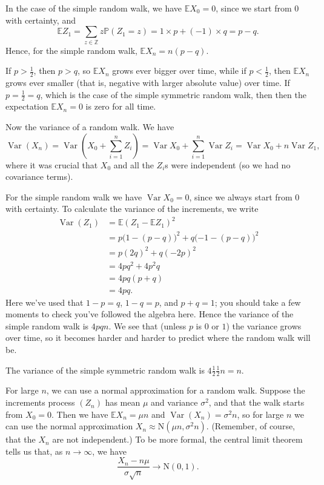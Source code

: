 \documentclass[
  a4paper,
]{article}
\theoremstyle{definition}
\theoremstyle{definition}
\theoremstyle{definition}
\theoremstyle{remark}
\begin{document}
In the case of the simple random walk, we have \(\mathbb E X_0 = 0\), since we start from \(0\) with certainty, and
\[ \mathbb E Z_1 = \sum_{z \in \mathbb Z} z \mathbb P(Z_1 = z) = 1\times p + (-1)\times q = p-q .\]
Hence, for the simple random walk, \(\mathbb EX_n = n(p-q)\).

If \(p > \frac12\), then \(p > q\), so \(\mathbb E X_n\) grows ever bigger over time, while if \(p < \frac12\), then \(\mathbb E X_n\) grows ever smaller (that is, negative with larger absolute value) over time. If \(p = \frac12 = q\), which is the case of the simple symmetric random walk, then then the expectation \(\mathbb E X_n = 0\) is zero for all time.

Now the variance of a random walk. We have
\[ \operatorname{Var}(X_n) = \operatorname{Var}\left(X_0 + \sum_{i=1}^n Z_i\right) = \operatorname{Var}X_0 + \sum_{i=1}^n \operatorname{Var}Z_i = \operatorname{Var}X_0 + n \operatorname{Var}Z_1 , \]
where it was crucial that \(X_0\) and all the \(Z_i\)s were independent (so we had no covariance terms).

For the simple random walk we have \(\operatorname{Var}X_0 = 0\), since we always start from \(0\) with certainty. To calculate the variance of the increments, we write
\begin{align*}
  \operatorname{Var}(Z_1) &= \mathbb E (Z_1 - \mathbb EZ_1)^2 \\
            &= p\big(1 - (p-q)\big)^2 + q \big( {-1} - (p-q)\big)^2\\
            &= p(2q)^2 + q(-2p)^2\\
            &= 4pq^2 + 4p^2q \\
            &= 4pq(p+q) \\
            &= 4pq .
  \end{align*}
Here we've used that \(1-p = q\), \(1-q=p\), and \(p+q = 1\); you should take a few moments to check you've followed the algebra here. Hence the variance of the simple random walk is \(4pqn\). We see that (unless \(p\) is \(0\) or \(1\)) the variance grows over time, so it becomes harder and harder to predict where the random walk will be.

The variance of the simple symmetric random walk is \(4 \frac12 \frac12 n = n\).

For large \(n\), we can use a normal approximation for a random walk. Suppose the increments process \((Z_n)\) has mean \(\mu\) and variance \(\sigma^2\), and that the walk starts from \(X_0 = 0\). Then we have \(\mathbb E X_n = \mu n\) and \(\operatorname{Var}(X_n) = \sigma^2 n\), so for large \(n\) we can use the normal approximation \(X_n \approx \mathrm{N}(\mu n, \sigma^2 n)\). (Remember, of course, that the \(X_n\) are not independent.) To be more formal, the central limit theorem tells us that, as \(n \to \infty\), we have
\[ \frac{X_n - n\mu}{\sigma \sqrt{n}} \to \mathrm{N}(0,1) . \]
\end{document}
